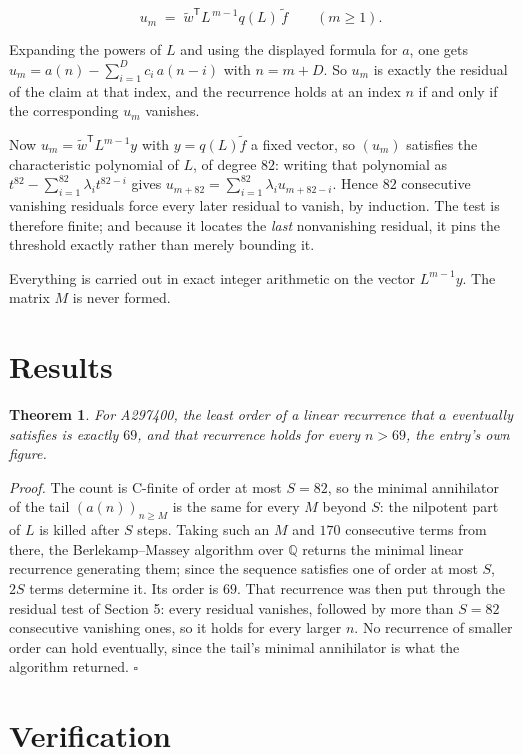 \documentclass[11pt]{article}
\newtheorem{theorem}{Theorem}
\theoremstyle{definition}
\begin{document}
\[u_m \;=\; \tilde w^{\mathsf T} L^{\,m-1} q(L)\,\tilde f \qquad (m \ge 1).\]

Expanding the powers of $L$ and using the displayed formula for $a$, one gets $u_m = a(n) - \sum_{i=1}^{D} c_i\,a(n-i)$ with $n = m + D$. So $u_m$ is exactly the residual of the claim at that index, and the recurrence holds at an index $n$ if and only if the corresponding $u_m$ vanishes.

Now $u_m = \tilde w^{\mathsf T} L^{m-1} y$ with $y = q(L)\tilde f$ a fixed vector, so $(u_m)$ satisfies the characteristic polynomial of $L$, of degree $82$: writing that polynomial as $t^{82} - \sum_{i=1}^{82} \lambda_i t^{82-i}$ gives $u_{m+82} = \sum_{i=1}^{82} \lambda_i u_{m+82-i}$. Hence $82$ consecutive vanishing residuals force every later residual to vanish, by induction. The test is therefore finite; and because it locates the {\itshape last} nonvanishing residual, it pins the threshold exactly rather than merely bounding it.

Everything is carried out in exact integer arithmetic on the vector $L^{m-1}y$. The matrix $M$ is never formed.

\section{Results}

\begin{theorem} For A297400, the least order of a linear recurrence that $a$ eventually satisfies is exactly $69$, and that recurrence holds for every $n > 69$, the entry's own figure.\end{theorem}

{\itshape Proof.} The count is C-finite of order at most $S = 82$, so the minimal annihilator of the tail $(a(n))_{n \ge M}$ is the same for every $M$ beyond $S$: the nilpotent part of $L$ is killed after $S$ steps. Taking such an $M$ and $170$ consecutive terms from there, the Berlekamp--Massey algorithm over $\mathbb{Q}$ returns the minimal linear recurrence generating them; since the sequence satisfies one of order at most $S$, $2S$ terms determine it. Its order is $69$. That recurrence was then put through the residual test of Section 5: every residual vanishes, followed by more than $S = 82$ consecutive vanishing ones, so it holds for every larger $n$. No recurrence of smaller order can hold eventually, since the tail's minimal annihilator is what the algorithm returned. $\square$

\section{Verification}
\end{document}
